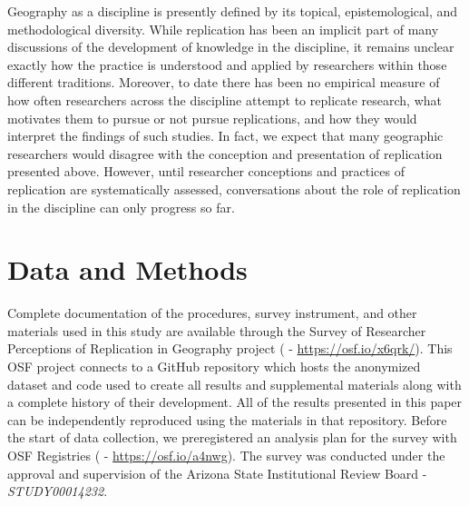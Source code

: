 \documentclass[]{interact}
\theoremstyle{plain}%
\theoremstyle{definition}
\theoremstyle{remark}
\begin{document}
Geography as a discipline is presently defined by its topical, epistemological, and methodological diversity. 
While replication has been an implicit part of many discussions of the development of knowledge in the discipline, it remains unclear exactly how the practice is understood and applied by researchers within those different traditions.
Moreover, to date there has been no empirical measure of how often researchers across the discipline attempt to replicate research, what motivates them to pursue or not pursue replications, and how they would interpret the findings of such studies. 
In fact, we expect that many geographic researchers would disagree with the conception and presentation of replication presented above. 
However, until researcher conceptions and practices of replication are systematically assessed, conversations about the role of replication in the discipline can only progress so far.


\section*{Data and Methods}
Complete documentation of the procedures, survey instrument, and other materials used in this study are available through the Survey of Researcher Perceptions of Replication in Geography project (\citet{Kedron_Holler_Bardin_Hilgendorf_2022} - \url{https://osf.io/x6qrk/}).
This OSF project connects to a GitHub repository which hosts the anonymized dataset and code used to create all results and supplemental materials along with a complete history of their development. 
All of the results presented in this paper can be independently reproduced using the materials in that repository.
Before the start of data collection, we preregistered an analysis plan for the survey with OSF Registries (\citet{Kedron_RPl_Survey_PAP} - \url{https://osf.io/a4nwg}). 
The survey was conducted under the approval and supervision of the Arizona State Institutional Review Board - \textit{STUDY00014232}.

\end{document}
